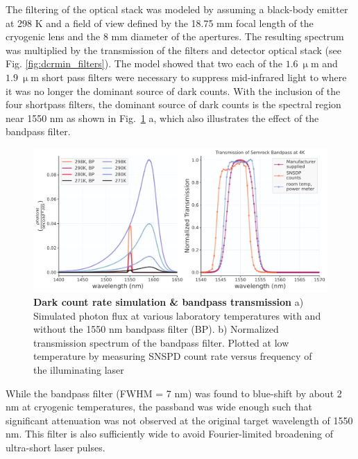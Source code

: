 \documentclass[11pt]{caltech_thesis} %
\begin{document}
The filtering of the optical stack was modeled by assuming a black-body emitter at 298 K and a field of view defined by the 18.75 mm focal length of the cryogenic lens and the 8 mm diameter of the apertures. The resulting spectrum was multiplied by the transmission of the filters and detector optical stack (see Fig. \ref{fig:dcrmin_filters}). The model showed that two each of the $1.6 \ \mathrm{\upmu m}$ and $1.9 \ \mathrm{\upmu m}$ short pass filters were necessary to suppress mid-infrared light to where it was no longer the dominant source of dark counts. With the inclusion of the four shortpass filters, the dominant source of dark counts is the spectral region near 1550 nm as shown in Fig.~\ref{fig:simulation_filter} a, which also illustrates the effect of the bandpass filter.

\hypertarget{fig:simulation_filter}{%
\begin{figure}
\centering
\includegraphics[width=1\textwidth,height=\textheight]{./chapter_02/figs/simulation_filter_thesis_light.pdf}
\caption[{Dark count rate simulation \& bandpass transmission}]{\textbf{Dark count rate simulation \& bandpass transmission} a) Simulated photon flux at various laboratory temperatures with and without the 1550 nm bandpass filter (BP). b) Normalized transmission spectrum of the bandpass filter. Plotted at low temperature by measuring SNSPD count rate versus frequency of the illuminating laser}
\label{fig:simulation_filter}
\end{figure}
}

While the bandpass filter (FWHM = 7 nm) was found to blue-shift by about 2 nm at cryogenic temperatures, the passband was wide enough such that significant attenuation was not observed at the original target wavelength of 1550 nm. This filter is also sufficiently wide to avoid Fourier-limited broadening of ultra-short laser pulses.
\end{document}
